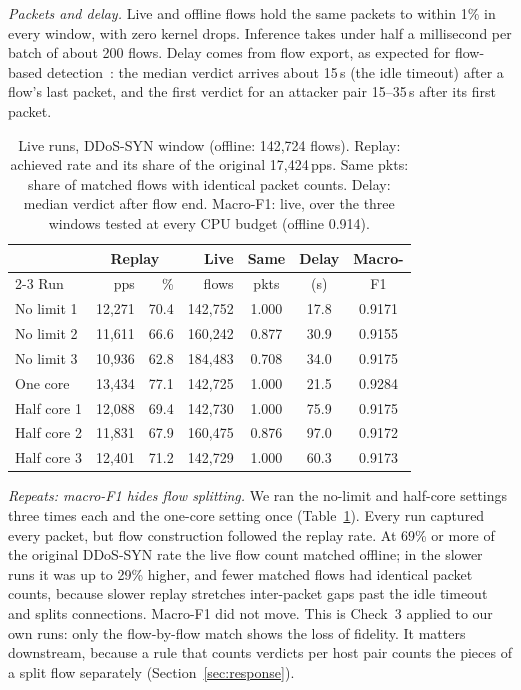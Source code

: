 \emph{Packets and delay.} Live and offline flows hold the same packets to within 1\% in every window, with zero kernel drops. Inference takes under half a millisecond per batch of about 200 flows. Delay comes from flow export, as expected for flow-based detection~\cite{hofstede2013realtime}: the median verdict arrives about 15\,s (the idle timeout) after a flow's last packet, and the first verdict for an attacker pair 15--35\,s after its first packet.

\begin{table}[t]
\centering
\caption{Live runs, DDoS-SYN window (offline: 142,724 flows). Replay: achieved rate and its share of the original 17,424\,pps. Same pkts: share of matched flows with identical packet counts. Delay: median verdict after flow end. Macro-F1: live, over the three windows tested at every CPU budget (offline 0.914).}
\label{tab:repeats}
\footnotesize
\setlength{\tabcolsep}{2.5pt}
\begin{tabular}{lrrrccc}
\toprule
 & \multicolumn{2}{c}{Replay} & Live & Same & Delay & Macro- \\
\cmidrule(lr){2-3}
Run & pps & \% & flows & pkts & (s) & F1 \\
\midrule
No limit 1  & 12,271 & 70.4 & 142,752 & 1.000 & 17.8 & 0.9171 \\
No limit 2  & 11,611 & 66.6 & 160,242 & 0.877 & 30.9 & 0.9155 \\
No limit 3  & 10,936 & 62.8 & 184,483 & 0.708 & 34.0 & 0.9175 \\
One core    & 13,434 & 77.1 & 142,725 & 1.000 & 21.5 & 0.9284 \\
Half core 1 & 12,088 & 69.4 & 142,730 & 1.000 & 75.9 & 0.9175 \\
Half core 2 & 11,831 & 67.9 & 160,475 & 0.876 & 97.0 & 0.9172 \\
Half core 3 & 12,401 & 71.2 & 142,729 & 1.000 & 60.3 & 0.9173 \\
\bottomrule
\end{tabular}
\end{table}

\emph{Repeats: macro-F1 hides flow splitting.} We ran the no-limit and half-core settings three times each and the one-core setting once (Table~\ref{tab:repeats}). Every run captured every packet, but flow construction followed the replay rate. At 69\% or more of the original DDoS-SYN rate the live flow count matched offline; in the slower runs it was up to 29\% higher, and fewer matched flows had identical packet counts, because slower replay stretches inter-packet gaps past the idle timeout and splits connections. Macro-F1 did not move. This is Check~3 applied to our own runs: only the flow-by-flow match shows the loss of fidelity. It matters downstream, because a rule that counts verdicts per host pair counts the pieces of a split flow separately (Section~\ref{sec:response}).

